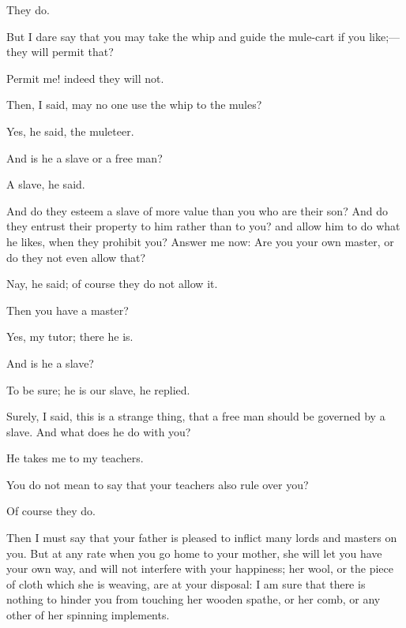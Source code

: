 \documentclass[11pt,letter]{article}
\begin{document}
\par  They do.

\par  But I dare say that you may take the whip and guide the mule-cart if you like;—they will permit that?

\par  Permit me! indeed they will not.

\par  Then, I said, may no one use the whip to the mules?

\par  Yes, he said, the muleteer.

\par  And is he a slave or a free man?

\par  A slave, he said.

\par  And do they esteem a slave of more value than you who are their son? And do they entrust their property to him rather than to you? and allow him to do what he likes, when they prohibit you? Answer me now: Are you your own master, or do they not even allow that?

\par  Nay, he said; of course they do not allow it.

\par  Then you have a master?

\par  Yes, my tutor; there he is.

\par  And is he a slave?

\par  To be sure; he is our slave, he replied.

\par  Surely, I said, this is a strange thing, that a free man should be governed by a slave. And what does he do with you?

\par  He takes me to my teachers.

\par  You do not mean to say that your teachers also rule over you?

\par  Of course they do.

\par  Then I must say that your father is pleased to inflict many lords and masters on you. But at any rate when you go home to your mother, she will let you have your own way, and will not interfere with your happiness; her wool, or the piece of cloth which she is weaving, are at your disposal: I am sure that there is nothing to hinder you from touching her wooden spathe, or her comb, or any other of her spinning implements.
\end{document}
